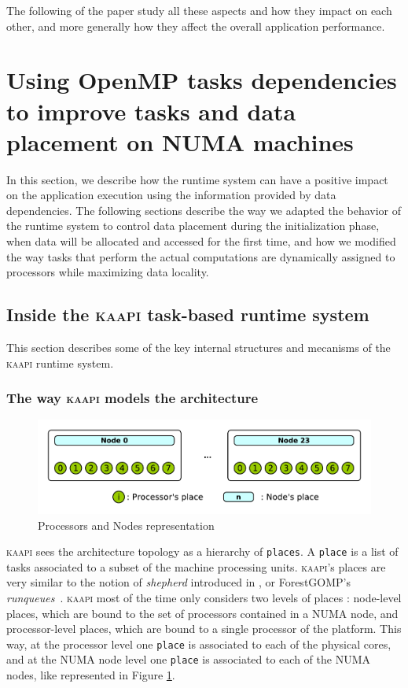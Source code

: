 \documentclass{Styles/llncs}
\newcommand{\kaapi}{\textsc{\mbox{kaapi}}\xspace}
\begin{document}
The following of the paper study all these aspects and how they impact on each other, and more generally how they affect the overall application performance.

\section{Using OpenMP tasks dependencies to improve tasks and data
  placement on NUMA machines}

In this section, we describe how the runtime system can have a positive impact on the application execution using the information provided by data dependencies.
The following sections describe the way we adapted the behavior of the runtime system to control data placement during the initialization phase, when data will be allocated and accessed for the first time, and how we modified the way tasks that perform the actual computations are dynamically assigned to processors while maximizing data locality.


\subsection{Inside the \kaapi task-based runtime system}

This section describes some of the key internal structures and mecanisms of the \kaapi runtime system.

\subsubsection{The way \kaapi models the architecture}

\begin{figure}[t]
  \centering
  \includegraphics[scale=0.65]{./figures/topology.pdf}
\caption{Processors and Nodes representation}
\label{fig:detail-topology}
\end{figure}

\kaapi sees the architecture topology as a hierarchy of \verb/places/.
A \verb/place/ is a list of tasks associated to a subset of the machine processing units.
\kaapi's places are very similar to the notion of \emph{shepherd} introduced in \cite{DBLP:journals/ijhpca/OlivierPWSP12}, or ForestGOMP's \emph{runqueues}~\cite{BroFurGogWacNam10IJPP}.
\kaapi most of the time only considers two levels of places : node-level places, which are bound to the set of processors contained in a NUMA node, and processor-level places, which are bound to a single processor of the platform.
This way, at the processor level one \verb/place/ is associated to each of the physical cores, and
at the NUMA node level one \verb/place/ is associated to each of the NUMA nodes, like represented in
Figure \ref{fig:detail-topology}.
\end{document}
